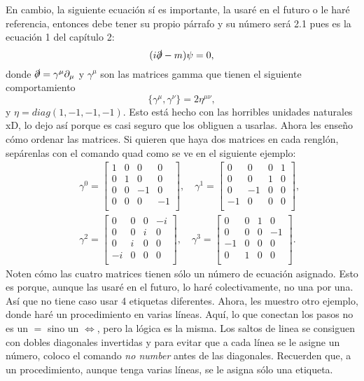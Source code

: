 \documentclass[letter,twoside,12pt]{book}
\begin{document}
En cambio, la siguiente ecuación sí es importante, la usaré en el futuro o le haré referencia, entonces debe tener su propio párrafo y su número será 2.1 pues es la ecuación 1 del capítulo 2:
\begin{equation}
    (i\slashed \partial-m)\psi=0, \label{dirac}
\end{equation}
donde $\slashed \partial=\gamma^{\mu}\partial_{\mu}$ y $\gamma^{\mu}$ son las matrices gamma que tienen el siguiente comportamiento
\begin{equation}
    \{\gamma^{\mu},\gamma^{\nu}\}=2\eta^{\mu\nu}, \label{anticonm}
\end{equation}
y $\eta = diag(1,-1,-1,-1)$. Esto está hecho con las horribles unidades naturales xD, lo dejo así porque es casi seguro que los obliguen a usarlas. Ahora les enseño cómo ordenar las matrices. Si quieren que haya dos matrices en cada renglón, sepárenlas con el comando quad como se ve en el siguiente ejemplo:
\begin{eqnarray}
&&     
\gamma^0=\begin{bmatrix}
1 & 0 & 0 & 0 \\
0 & 1 & 0 & 0 \\
0 & 0 & -1 & 0 \\
0 & 0 & 0 & -1 \\
\end{bmatrix}, \quad
\gamma^1=\begin{bmatrix}
0 & 0 & 0 & 1 \\
0 & 0 & 1 & 0 \\
0 & -1 & 0 & 0 \\
-1 & 0 & 0 & 0 \\
\end{bmatrix},
\nonumber \\
&& \gamma^2=\begin{bmatrix}
0 & 0 & 0 & -i \\
0 & 0 & i & 0 \\
0 & i & 0 & 0 \\
-i & 0 & 0 & 0 \\
\end{bmatrix}, \quad
\gamma^3=\begin{bmatrix}
0 & 0 & 1 & 0 \\
0 & 0 & 0 & -1 \\
-1 & 0 & 0 & 0 \\
0 & 1 & 0 & 0 \\
\end{bmatrix}.\label{gamma}
\end{eqnarray}
Noten cómo las cuatro matrices tienen sólo un número de ecuación asignado. Esto es porque, aunque las usaré en el futuro, lo haré colectivamente, no una por una. Así que no tiene caso usar 4 etiquetas diferentes. 
Ahora, les muestro otro ejemplo, donde haré un procedimiento en varias líneas. Aquí, lo que conectan los pasos no es un $=$ sino un $\Leftrightarrow$, pero la lógica es la misma. Los saltos de linea se consiguen con dobles diagonales invertidas y para evitar que a cada línea se le asigne un número, coloco el comando \textit{no number} antes de las diagonales. 
Recuerden que, a un procedimiento, aunque tenga varias líneas, se le asigna sólo una etiqueta. 
\end{document}
